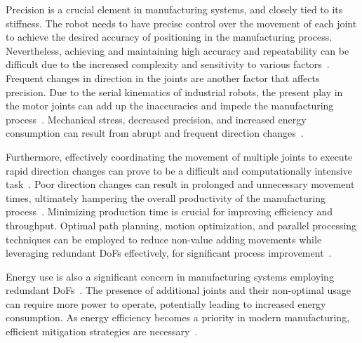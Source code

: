 Precision is a crucial element in manufacturing systems, and closely tied to its stiffness. The robot needs to have precise control over the movement of each joint to achieve the desired accuracy of positioning in the manufacturing process. Nevertheless, achieving and maintaining high accuracy and repeatability can be difficult due to the increased complexity and sensitivity to various factors~\cite{Duong.2021}. %
Frequent changes in direction in the joints are another factor that affects precision. 
Due to the serial kinematics of industrial robots, the present play in the motor joints can add up the inaccuracies and impede the manufacturing process~\cite{Huynh.2020, ChenGang.2014}. Mechanical stress, decreased precision, and increased energy consumption can result from abrupt and frequent direction changes~\cite{Gasparetto.2010}.
 
Furthermore, effectively coordinating the movement of multiple joints to execute rapid direction changes can prove to be a difficult and computationally intensive task~\cite{VandeWeghe.2007}. Poor direction changes can result in prolonged and unnecessary movement times, ultimately hampering the overall productivity of the manufacturing process~\cite{Reiter.2016}. %
Minimizing production time is crucial for improving efficiency and throughput. Optimal path planning, motion optimization, and parallel processing techniques can be employed to reduce non-value adding movements while leveraging redundant \acrshort{DoF}s effectively, for significant process improvement~\cite{Boscariol.2020}.




Energy use is also a significant concern in manufacturing systems employing redundant \acrshort{DoF}s~\cite{Doan.2016}. The presence of additional joints and their non-optimal usage can require more power to operate, potentially leading to increased energy consumption. As energy efficiency becomes a priority in modern manufacturing, efficient mitigation strategies are necessary~\cite{Boscariol.2020, Boscariol.2019}. 

